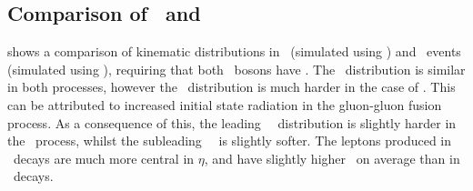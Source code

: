 \subsection{Comparison of \ggZZ\ and \qqZZ}

 shows a comparison of kinematic distributions in \ggZZ\ 
(simulated using \ggtwoZZ) and \qqZZ\ events (simulated using \powhegbox), 
requiring that both \Z\ bosons have \sstooos. 
The \mZZ\ distribution is similar in both 
processes, however the \ptZZ\ distribution is much harder in the case of \ggZZ.  
This can be attributed to increased initial state radiation in the gluon-gluon 
fusion process. As a consequence of this, the leading \Z\ \pt\ distribution is 
slightly harder in the \ggZZ\ process, whilst the subleading \Z\ \pt\ is 
slightly softer. The leptons produced in \ggZZ\ decays are much more central in
$\eta$, 
and have slightly higher \pt\ on average than in \qqZZ\ decays.

